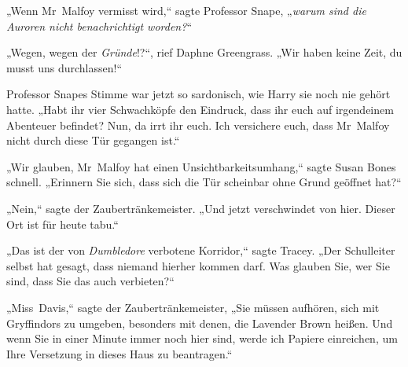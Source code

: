 „Wenn Mr~Malfoy vermisst wird,“ sagte Professor Snape, „\emph{warum sind die Auroren nicht benachrichtigt worden?}“

„Wegen, wegen der \emph{Gründe}!?“, rief Daphne Greengrass. „Wir haben keine Zeit, du musst uns durchlassen!“

Professor Snapes Stimme war jetzt so sardonisch, wie Harry sie noch nie gehört hatte.
„Habt ihr vier Schwachköpfe den Eindruck, dass ihr euch auf irgendeinem Abenteuer befindet? Nun, da irrt ihr euch. Ich versichere euch, dass Mr~Malfoy nicht durch diese Tür gegangen ist.“

„Wir glauben, Mr~Malfoy hat einen Unsichtbarkeitsumhang,“ sagte Susan Bones schnell. „Erinnern Sie sich, dass sich die Tür scheinbar ohne Grund geöffnet hat?“

„Nein,“ sagte der Zaubertränkemeister. „Und jetzt verschwindet von hier. Dieser Ort ist für heute tabu.“

„Das ist der von \emph{Dumbledore} verbotene Korridor,“ sagte Tracey. „Der Schulleiter selbst hat gesagt, dass niemand hierher kommen darf. Was glauben Sie, wer Sie sind, dass Sie das auch verbieten?“

„Miss~Davis,“ sagte der Zaubertränkemeister, „Sie müssen aufhören, sich mit Gryffindors zu umgeben, besonders mit denen, die Lavender Brown heißen. Und wenn Sie in einer Minute immer noch hier sind, werde ich Papiere einreichen, um Ihre Versetzung in dieses Haus zu beantragen.“

